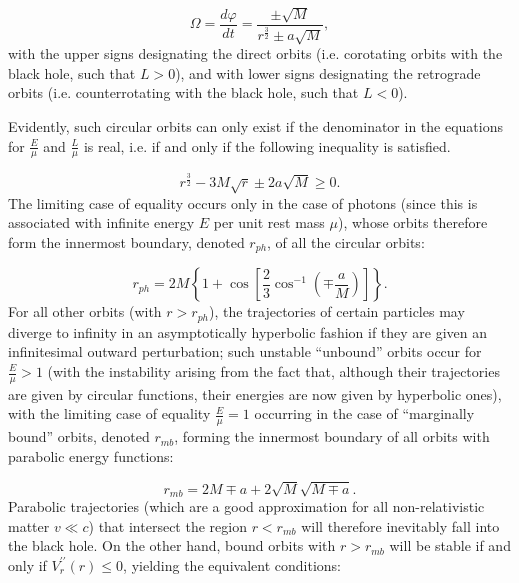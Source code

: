 \documentclass{article}
\begin{document}
\begin{equation}
\Omega = \frac{d \varphi}{dt} = \frac{\pm \sqrt{M}}{r^{\frac{3}{2}} \pm a \sqrt{M}},
\end{equation}
with the upper signs designating the direct orbits (i.e. corotating orbits with the black hole, such that ${L > 0}$), and with lower signs designating the retrograde orbits (i.e. counterrotating with the black hole, such that ${L < 0}$).

Evidently, such circular orbits can only exist if the denominator in the equations for ${\frac{E}{\mu}}$ and ${\frac{L}{\mu}}$ is real, i.e. if and only if the following inequality is satisfied.

\begin{equation}
r^\frac{3}{2} - 3 M \sqrt{r} \pm 2 a \sqrt{M} \geq 0.
\end{equation}
The limiting case of equality occurs only in the case of photons (since this is associated with infinite energy $E$ per unit rest mass ${\mu}$), whose orbits therefore form the innermost boundary, denoted ${r_{ph}}$, of all the circular orbits:

\begin{equation}
r_{ph} = 2M \left\lbrace 1 + \cos \left[ \frac{2}{3} \cos^{-1} \left( \mp \frac{a}{M} \right) \right] \right\rbrace.
\end{equation}
For all other orbits (with ${r > r_{ph}}$), the trajectories of certain particles may diverge to infinity in  an asymptotically hyperbolic fashion if they are given an infinitesimal outward perturbation; such unstable ``unbound'' orbits occur for ${\frac{E}{\mu} > 1}$ (with the instability arising from the fact that, although their trajectories are given by circular functions, their energies are now given by hyperbolic ones), with the limiting case of equality ${\frac{E}{\mu} = 1}$ occurring in the case of ``marginally bound'' orbits, denoted ${r_{mb}}$, forming the innermost boundary of all orbits with parabolic energy functions:

\begin{equation}
r_{mb} = 2M \mp a + 2 \sqrt{M} \sqrt{M \mp a}.
\end{equation}
Parabolic trajectories (which are a good approximation for all non-relativistic matter ${v \ll c}$) that intersect the region ${r < r_{mb}}$ will therefore inevitably fall into the black hole. On the other hand, bound orbits with ${r > r_{mb}}$ will be stable if and only if ${V_{r}^{\prime \prime} \left( r \right) \leq 0}$, yielding the equivalent conditions:
\end{document}
